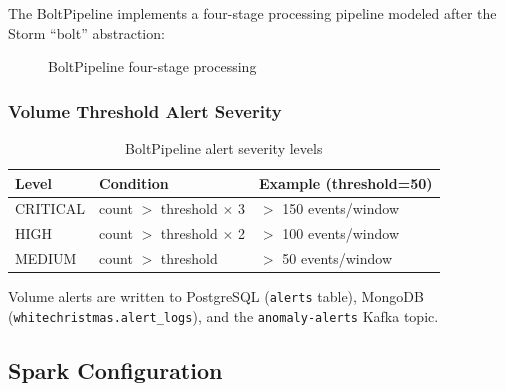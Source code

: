 \documentclass[12pt,a4paper]{article}
\begin{document}
The BoltPipeline implements a four-stage processing pipeline modeled after the Storm ``bolt'' abstraction:

\begin{figure}[H]
\centering
{}
\caption{BoltPipeline four-stage processing}
\end{figure}

\subsubsection{Volume Threshold Alert Severity}

\begin{table}[H]
\centering
\caption{BoltPipeline alert severity levels}
\begin{tabular}{l l l}
\toprule
\textbf{Level} & \textbf{Condition} & \textbf{Example (threshold=50)} \\
\midrule
CRITICAL & count $>$ threshold $\times$ 3 & $>$ 150 events/window \\
HIGH & count $>$ threshold $\times$ 2 & $>$ 100 events/window \\
MEDIUM & count $>$ threshold & $>$ 50 events/window \\
\bottomrule
\end{tabular}
\end{table}

Volume alerts are written to PostgreSQL (\texttt{alerts} table), MongoDB (\texttt{whitechristmas.alert\_logs}), and the \texttt{anomaly-alerts} Kafka topic.

\subsection{Spark Configuration}
\end{document}
